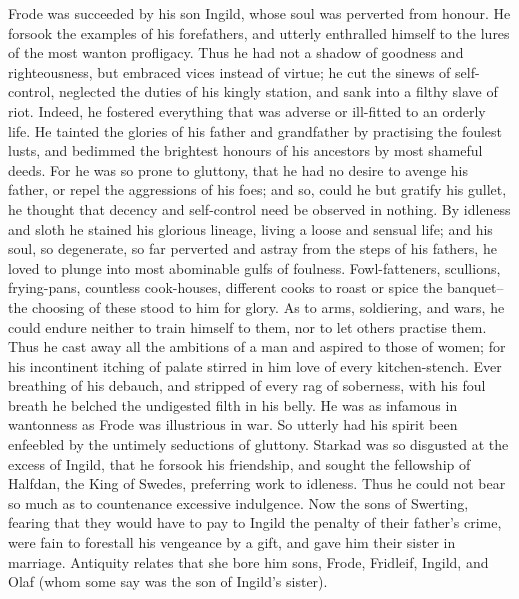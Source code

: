 \documentclass[10pt,a4paper]{report}
\begin{document}
Frode was succeeded by his son Ingild, whose soul was perverted from honour. He forsook the examples of his forefathers, and utterly enthralled himself to the lures of the most wanton profligacy. Thus he had not a shadow of goodness and righteousness, but embraced vices instead of virtue; he cut the sinews of self-control, neglected the duties of his kingly station, and sank into a filthy slave of riot. Indeed, he fostered everything that was adverse or ill-fitted to an orderly life. He tainted the glories of his father and grandfather by practising the foulest lusts, and bedimmed the brightest honours of his ancestors by most shameful deeds. For he was so prone to gluttony, that he had no desire to avenge his father, or repel the aggressions of his foes; and so, could he but gratify his gullet, he thought that decency and self-control need be observed in nothing. By idleness and sloth he stained his glorious lineage, living a loose and sensual life; and his soul, so degenerate, so far perverted and astray from the steps of his fathers, he loved to plunge into most abominable gulfs of foulness. Fowl-fatteners, scullions, frying-pans, countless cook-houses, different cooks to roast or spice the banquet--the choosing of these stood to him for glory. As to arms, soldiering, and wars, he could endure neither to train himself to them, nor to let others practise them. Thus he cast away all the ambitions of a man and aspired to those of women; for his incontinent itching of palate stirred in him love of every kitchen-stench. Ever breathing of his debauch, and stripped of every rag of soberness, with his foul breath he belched the undigested filth in his belly. He was as infamous in wantonness as Frode was illustrious in war. So utterly had his spirit been enfeebled by the untimely seductions of gluttony. Starkad was so disgusted at the excess of Ingild, that he forsook his friendship, and sought the fellowship of Halfdan, the King of Swedes, preferring work to idleness. Thus he could not bear so much as to countenance excessive indulgence. Now the sons of Swerting, fearing that they would have to pay to Ingild the penalty of their father's crime, were fain to forestall his vengeance by a gift, and gave him their sister in marriage. Antiquity relates that she bore him sons, Frode, Fridleif, Ingild, and Olaf (whom some say was the son of Ingild's sister).\\
\end{document}
